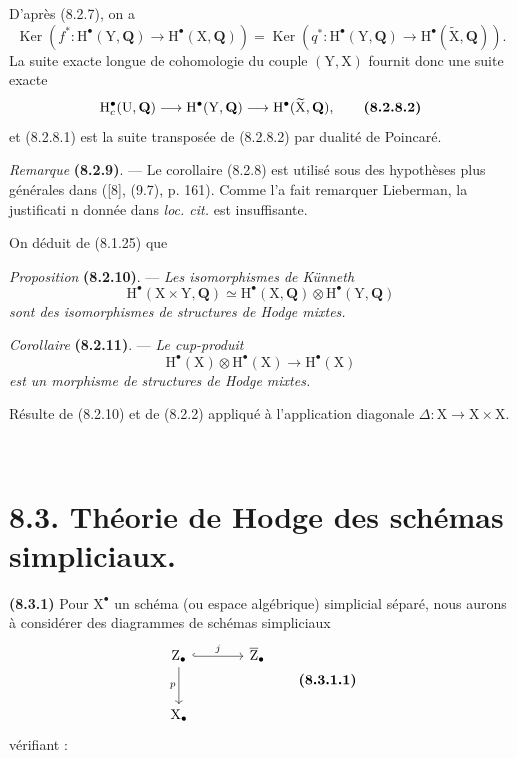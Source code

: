 \documentclass[11pt,leqno]{article}
\newcommand{\Page}[1]{\ifvmode\noindent\else\unskip\ \fi{\footnotesize\textcolor{gray}{[p.\,#1]}}\ \ignorespaces}
\begin{document}
D’après (8.2.7), on a
\[
\operatorname{Ker}(f^*:\mathrm{H}^\bullet(\mathrm{Y},\mathbf{Q})
 \to\mathrm{H}^\bullet(\mathrm{X},\mathbf{Q}))
=
\operatorname{Ker}(q^*:\mathrm{H}^\bullet(\mathrm{Y},\mathbf{Q})
 \to\mathrm{H}^\bullet(\widetilde{\mathrm{X}},\mathbf{Q})).
\]
La suite exacte longue de cohomologie du couple \((\mathrm{Y},\mathrm{X})\) fournit donc une suite exacte
\[
\mathrm{H}_c^\bullet(\mathrm{U},\mathbf{Q})
\longrightarrow\mathrm{H}^\bullet(\mathrm{Y},\mathbf{Q})
\longrightarrow\mathrm{H}^\bullet(\widetilde{\mathrm{X}},\mathbf{Q}),
\tag*{\textbf{(8.2.8.2)}}
\]
et (8.2.8.1) est la suite transposée de (8.2.8.2) par dualité de Poincaré.

\textit{Remarque} \textbf{(8.2.9)}. — Le corollaire (8.2.8) est utilisé sous des hypothèses plus générales dans ([8], (9.7), p. 161). Comme l’a fait remarquer Lieberman, la justificati n donnée dans \textit{loc. cit.} est insuffisante.

On déduit de (8.1.25) que

\textit{Proposition} \textbf{(8.2.10)}. — \textit{Les isomorphismes de Künneth}
\[
\mathrm{H}^\bullet(\mathrm{X}\times\mathrm{Y},\mathbf{Q})
\simeq
\mathrm{H}^\bullet(\mathrm{X},\mathbf{Q})
\otimes\mathrm{H}^\bullet(\mathrm{Y},\mathbf{Q})
\]
\textit{sont des isomorphismes de structures de Hodge mixtes.}

\textit{Corollaire} \textbf{(8.2.11)}. — \textit{Le cup-produit}
\[
\mathrm{H}^\bullet(\mathrm{X})\otimes\mathrm{H}^\bullet(\mathrm{X})
\longrightarrow\mathrm{H}^\bullet(\mathrm{X})
\]
\textit{est un morphisme de structures de Hodge mixtes.}

Résulte de (8.2.10) et de (8.2.2) appliqué à l’application diagonale \(\Delta:\mathrm{X}\to\mathrm{X}\times\mathrm{X}\).

\Page{41}
\section*{8.3. Théorie de Hodge des schémas simpliciaux.}

\textbf{(8.3.1)} Pour \(\mathrm{X}^\bullet\) un schéma (ou espace algébrique) simplicial séparé, nous aurons à considérer des diagrammes de schémas simpliciaux
\[
\begin{tikzcd}[column sep=large,row sep=large]
\mathrm{Z}_\bullet \arrow[r,hook,"j"] \arrow[d,"p"']
 & \overline{\mathrm{Z}}_\bullet\\
\mathrm{X}_\bullet &
\end{tikzcd}
\tag*{\textbf{(8.3.1.1)}}
\]
vérifiant :
\end{document}
